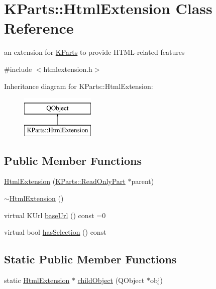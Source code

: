 \hypertarget{classKParts_1_1HtmlExtension}{\section{K\+Parts\+:\+:Html\+Extension Class Reference}
\label{classKParts_1_1HtmlExtension}
}


an extension for \hyperlink{namespaceKParts}{K\+Parts} to provide H\+T\+M\+L-\/related features  




{\ttfamily \#include $<$htmlextension.\+h$>$}

Inheritance diagram for K\+Parts\+:\+:Html\+Extension\+:\begin{figure}[H]
\begin{center}
\leavevmode
\includegraphics[height=2.000000cm]{classKParts_1_1HtmlExtension}
\end{center}
\end{figure}
\subsection*{Public Member Functions}
\begin{DoxyCompactItemize}
\item 
\hyperlink{classKParts_1_1HtmlExtension_ab75dcddad99744aad01a10b9b46b4f61}{Html\+Extension} (\hyperlink{classKParts_1_1ReadOnlyPart}{K\+Parts\+::\+Read\+Only\+Part} $\ast$parent)
\item 
\hyperlink{classKParts_1_1HtmlExtension_a090a296e890f968563d0352d4836efdd}{$\sim$\+Html\+Extension} ()
\item 
virtual K\+Url \hyperlink{classKParts_1_1HtmlExtension_a4be55820c257361f38ad9a595048bf5e}{base\+Url} () const =0
\item 
virtual bool \hyperlink{classKParts_1_1HtmlExtension_af3fe68c816bf92e14ceafdbf5179f134}{has\+Selection} () const 
\end{DoxyCompactItemize}
\subsection*{Static Public Member Functions}
\begin{DoxyCompactItemize}
\item 
static \hyperlink{classKParts_1_1HtmlExtension}{Html\+Extension} $\ast$ \hyperlink{classKParts_1_1HtmlExtension_a1008467fb117fa5dcf7cba422aa91f68}{child\+Object} (Q\+Object $\ast$obj)
\end{DoxyCompactItemize}



